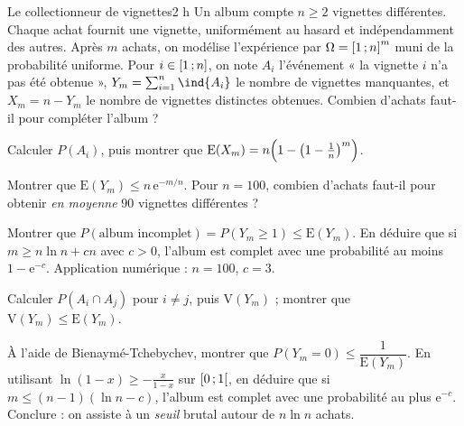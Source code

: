 

\begin{defi}{Le collectionneur de vignettes}{2 h}
Un album compte $n\geqslant2$ vignettes différentes. Chaque achat fournit
une vignette, uniformément au hasard et indépendamment des autres. Après
$m$ achats, on modélise l'expérience par $\Omega=\mathopen{[}1\,{;}\,n\mathclose{]}^{m}$ muni de la
probabilité uniforme. Pour $i\in\mathopen{[}1\,{;}\,n\mathclose{]}$, on note $A_i$ l'événement « la
vignette $i$ n'a pas été obtenue », $Y_m=\sum_{i=1}^{n}\ind{A_i}$ le nombre
de vignettes manquantes, et $X_m=n-Y_m$ le nombre de vignettes distinctes
obtenues. Combien d'achats faut-il pour compléter l'album ?

\begin{questions}
  \item Calculer $P(A_i)$, puis montrer que
    $\mathrm{E}(X_m)=n\Bigl(1-\bigl(1-\frac1n\bigr)^{m}\Bigr)$.
  \item Montrer que $\mathrm{E}(Y_m)\leqslant n\,\mathrm{e}^{-m/n}$. Pour
    $n=100$, combien d'achats faut-il pour obtenir \emph{en moyenne} $90$
    vignettes différentes ?
\end{questions}

\begin{questions}[resume]
  \item Montrer que $P(\text{album incomplet})=P(Y_m\geqslant1)\leqslant\mathrm{E}(Y_m)$.
    En déduire que si $m\geqslant n\ln n+cn$ avec $c>0$, l'album est
    complet avec une probabilité au moins $1-\mathrm{e}^{-c}$. Application
    numérique : $n=100$, $c=3$.
  \item Calculer $P(A_i\cap A_j)$ pour $i\neq j$, puis $\mathrm{V}(Y_m)$ ;
    montrer que $\mathrm{V}(Y_m)\leqslant\mathrm{E}(Y_m)$.
  \item À l'aide de Bienaymé-Tchebychev, montrer que
    $P(Y_m=0)\leqslant\dfrac{1}{\mathrm{E}(Y_m)}$. En utilisant
    $\ln(1-x)\geqslant-\frac{x}{1-x}$ sur $\mathopen{[}0\,{;}\,1\mathclose{[}$, en déduire que si
    $m\leqslant(n-1)(\ln n-c)$, l'album est complet avec une probabilité au
    plus $\mathrm{e}^{-c}$. Conclure : on assiste à un \emph{seuil} brutal
    autour de $n\ln n$ achats.
\end{questions}


\end{defi}
